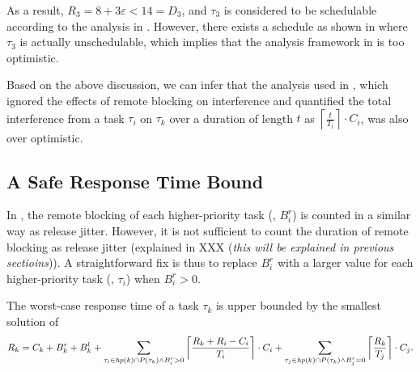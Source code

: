As a result, $R_3 = 8+3\varepsilon < 14 = D_3$, and $\tau_3$ is considered to be schedulable according to the analysis in \cite{lakshmanan-2009}. However, there exists a schedule as shown in  where $\tau_3$ is actually unschedulable, which implies that the analysis framework in \cite{lakshmanan-2009} is too optimistic. 

Based on the above discussion, we can infer that the analysis used in \cite{NBN:11}, which ignored the effects of remote blocking on interference and quantified the total interference from a task $\tau_i$ on $\tau_k$ over a duration of length $t$ as $\left \lceil \frac{t}{T_i} \right \rceil \cdot C_i$, was also over optimistic. 

\subsection{A Safe Response Time Bound}
\label{sec:safe_bound}

In , the remote blocking of each higher-priority task (\ie, $B_i^r$) is counted in a similar way as release jitter. However, it is not sufficient to count the duration of remote blocking as release jitter (explained in XXX (\emph{this will be explained in previous sectioins})). A straightforward fix is thus to replace $B_i^r$ with a larger value for each higher-priority task (\ie, $\tau_i$) when $B_i^r > 0$.

\begin{lemma}
\label{lem:new_framework}
The worst-case response time of a task $\tau_k$ is upper bounded by the smallest solution of 
\begin{align}
\label{eq:fix}
R_k = C_k + B_k^r + B_k^l + \sum_{\tau_i \in \fun{hp}(k) \cap P(\tau_k) \wedge B_i^r > 0} \left \lceil \frac{R_k + R_i - C_i}{T_i} \right \rceil \cdot C_i
+ \sum_{\tau_j \in \fun{hp}(k) \cap P(\tau_k) \wedge B_j^r = 0} \left \lceil \frac{R_k}{T_j} \right \rceil \cdot C_j.
\end{align}
\end{lemma}



